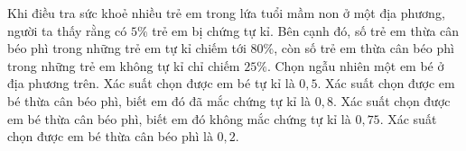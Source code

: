 \begin{ex}
Khi điều tra sức khoẻ nhiều trẻ em trong lứa tuổi mầm non ở một địa phương, người ta thấy rằng có $5\%$ trẻ em bị chứng tự kỉ. Bên cạnh đó, số trẻ em thừa cân béo phì trong những trẻ em tự kỉ chiếm tới $80\%$, còn số trẻ em thừa cân béo phì trong những trẻ em không tự kỉ chỉ chiếm $25\%$. Chọn ngẫu nhiên một em bé ở địa phương trên.
\choiceTF
{Xác suất chọn được em bé tự kỉ là $0{,}5$.}
{\True Xác suất chọn được em bé thừa cân béo phì, biết em đó đã mắc chứng tự kỉ là $0{,}8$.}
{Xác suất chọn được em bé thừa cân béo phì, biết em đó không mắc chứng tự kỉ là $0{,}75$.}
{Xác suất chọn được em bé thừa cân béo phì là $0{,}2$.}
\end{ex}
